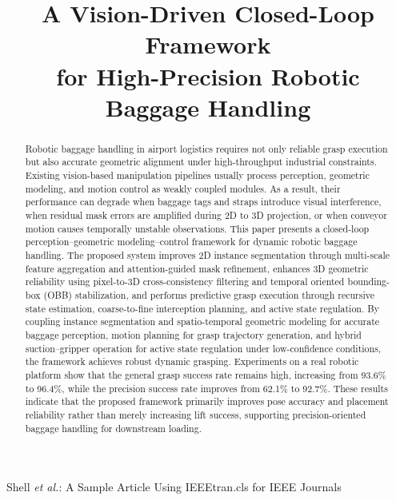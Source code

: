 \documentclass[lettersize,journal]{IEEEtran}
\DeclareRobustCommand{\revadd}[1]{{\color{red}#1}}
\begin{document}
\title{A Vision-Driven Closed-Loop Framework  \\ for High-Precision Robotic Baggage Handling}



%
{Shell \MakeLowercase{\textit{et al.}}: A Sample Article Using IEEEtran.cls for IEEE Journals}



\maketitle

\begin{abstract}
Robotic baggage handling in airport logistics requires not only reliable grasp execution but also accurate geometric alignment under high-throughput industrial constraints. Existing vision-based manipulation pipelines usually process perception, geometric modeling, and motion control as weakly coupled modules. As a result, their performance can degrade when baggage tags and straps introduce visual interference, when residual mask errors are amplified during 2D to 3D projection, or when conveyor motion causes temporally unstable observations. This paper presents a closed-loop perception--geometric modeling--control framework for dynamic robotic baggage handling. The proposed system improves 2D instance segmentation through multi-scale feature aggregation and attention-guided mask refinement, enhances 3D geometric reliability using pixel-to-3D cross-consistency filtering and temporal oriented bounding-box (OBB) stabilization, and performs predictive grasp execution through recursive state estimation, coarse-to-fine interception planning, and active state regulation. \revadd{By coupling instance segmentation and spatio-temporal geometric modeling for accurate baggage perception, motion planning for grasp trajectory generation, and hybrid suction--gripper operation for active state regulation under low-confidence conditions, the framework achieves robust dynamic grasping.} Experiments on a real robotic platform show that the general grasp success rate remains high, increasing from 93.6\% to 96.4\%, while the precision success rate improves from 62.1\% to 92.7\%. These results indicate that the proposed framework primarily improves pose accuracy and placement reliability rather than merely increasing lift success, \revadd{supporting precision-oriented baggage handling for downstream loading.}
\end{abstract}
\end{document}
